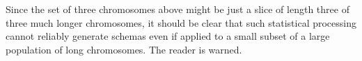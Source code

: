 Since the set of three chromosomes above might be just a slice of length
three of three much longer chromosomes, it should be clear that such
statistical processing cannot reliably generate schemas even if applied
to a small subset of a large population of long chromosomes. The reader
is warned.




